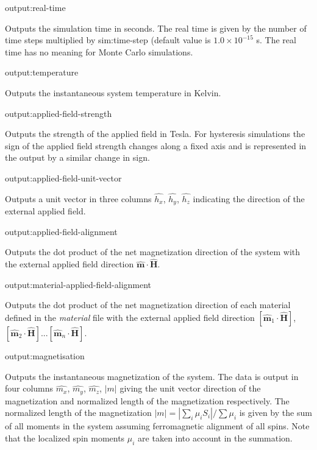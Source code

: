 {\zicf output:real-time} Outputs the simulation time in seconds. The real time is given by the number of time steps multiplied by sim:time-step (default value is $1.0 \times 10^{-15}$ s. The real time has no meaning for Monte Carlo simulations.

{\zicf output:temperature} Outputs the instantaneous system temperature in Kelvin.

{\zicf output:applied-field-strength} Outputs the strength of the applied field in Tesla. For hysteresis simulations the sign of the applied field strength changes along a fixed axis and is represented in the output by a similar change in sign.

{\zicf output:applied-field-unit-vector} Outputs a unit vector in three columns $\hat{h_x}$, $\hat{h_y}$, $\hat{h_z}$ indicating the direction of the external applied field.

{\zicf output:applied-field-alignment} Outputs the dot product of the net magnetization direction of the system with the external applied field direction $\hat{\mathbf{m}} \cdot \hat{\mathbf{H}}$.

{\zicf output:material-applied-field-alignment} Outputs the dot product of the net magnetization direction of each material defined in the \textit{material} file with the external applied field direction $\left[\hat{\mathbf{m}}_1 \cdot \hat{\mathbf{H}}\right]$, $\left[\hat{\mathbf{m}}_2 \cdot \hat{\mathbf{H}}\right]$...$\left[\hat{\mathbf{m}}_n \cdot \hat{\mathbf{H}}\right]$.

{\zicf output:magnetisation} Outputs the instantaneous magnetization of the system. The data is output in four columns $\hat{m_x}$, $\hat{m_y}$, $\hat{m_z}$, $|m|$ giving the unit vector direction of the magnetization and
normalized length of the magnetization respectively. The normalized length of the magnetization $|m| = |\sum_i \mu_i S_i| / \sum \mu_i$ is given by the sum of all moments in the system assuming ferromagnetic alignment of all spins. Note that the localized spin moments $\mu_i$ are taken into account in the summation.

